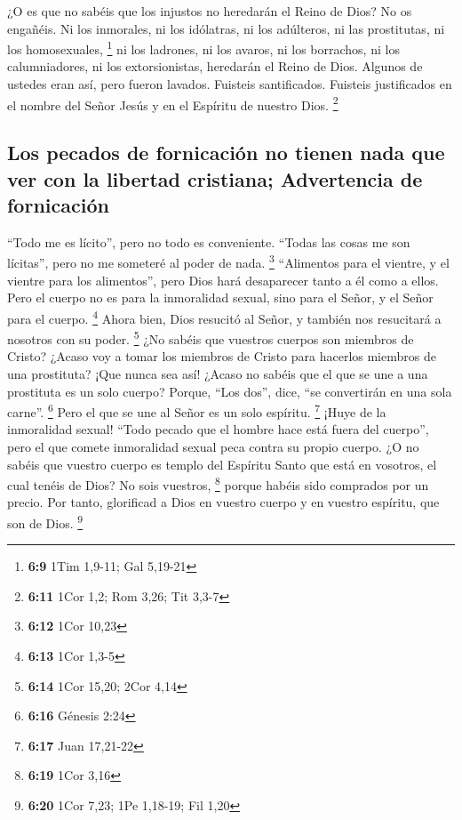 \begin{paracol}{2}
 ¿O es que no sabéis que los injustos no heredarán el
Reino de Dios? No os engañéis. Ni los inmorales, ni los idólatras, ni
los adúlteros, ni las prostitutas, ni los homosexuales, \footnote{\textbf{6:9}
  1Tim 1,9-11; Gal 5,19-21}  ni los ladrones, ni los
avaros, ni los borrachos, ni los calumniadores, ni los extorsionistas,
heredarán el Reino de Dios.  Algunos de ustedes eran así,
pero fueron lavados. Fuisteis santificados. Fuisteis justificados en el
nombre del Señor Jesús y en el Espíritu de nuestro Dios. \footnote{\textbf{6:11}
  1Cor 1,2; Rom 3,26; Tit 3,3-7}

\hypertarget{los-pecados-de-fornicaciuxf3n-no-tienen-nada-que-ver-con-la-libertad-cristiana-advertencia-de-fornicaciuxf3n}{%
\subsection{Los pecados de fornicación no tienen nada que ver con la
libertad cristiana; Advertencia de
fornicación}\label{los-pecados-de-fornicaciuxf3n-no-tienen-nada-que-ver-con-la-libertad-cristiana-advertencia-de-fornicaciuxf3n}}

 ``Todo me es lícito'', pero no todo es conveniente.
``Todas las cosas me son lícitas'', pero no me someteré al poder de
nada. \footnote{\textbf{6:12} 1Cor 10,23}  ``Alimentos
para el vientre, y el vientre para los alimentos'', pero Dios hará
desaparecer tanto a él como a ellos. Pero el cuerpo no es para la
inmoralidad sexual, sino para el Señor, y el Señor para el cuerpo.
\footnote{\textbf{6:13} 1Cor 1,3-5}  Ahora bien, Dios
resucitó al Señor, y también nos resucitará a nosotros con su poder.
\footnote{\textbf{6:14} 1Cor 15,20; 2Cor 4,14}  ¿No
sabéis que vuestros cuerpos son miembros de Cristo? ¿Acaso voy a tomar
los miembros de Cristo para hacerlos miembros de una prostituta? ¡Que
nunca sea así!  ¿Acaso no sabéis que el que se une a una
prostituta es un solo cuerpo? Porque, ``Los dos'', dice, ``se
convertirán en una sola carne''. \footnote{\textbf{6:16} Génesis 2:24}
 Pero el que se une al Señor es un solo espíritu.
\footnote{\textbf{6:17} Juan 17,21-22}  ¡Huye de la
inmoralidad sexual! ``Todo pecado que el hombre hace está fuera del
cuerpo'', pero el que comete inmoralidad sexual peca contra su propio
cuerpo.  ¿O no sabéis que vuestro cuerpo es templo del
Espíritu Santo que está en vosotros, el cual tenéis de Dios? No sois
vuestros, \footnote{\textbf{6:19} 1Cor 3,16}  porque
habéis sido comprados por un precio. Por tanto, glorificad a Dios en
vuestro cuerpo y en vuestro espíritu, que son de Dios. \footnote{\textbf{6:20}
  1Cor 7,23; 1Pe 1,18-19; Fil 1,20}


\end{paracol}
